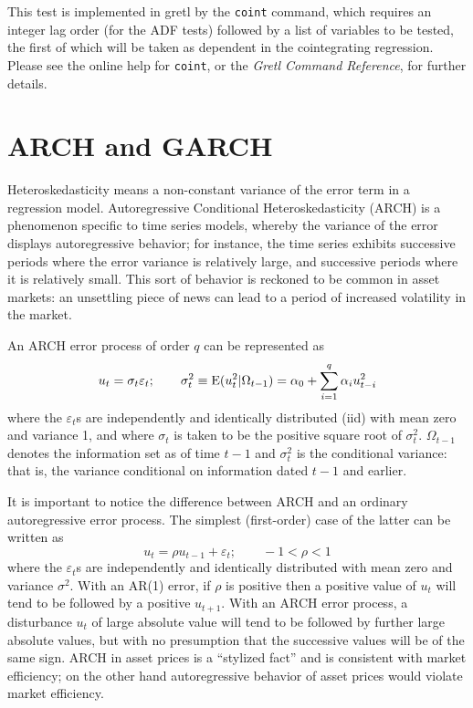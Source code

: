 This test is implemented in gretl by the \texttt{coint} command,
which requires an integer lag order (for the ADF tests) followed by a
list of variables to be tested, the first of which will be taken as
dependent in the cointegrating regression. Please see the online help
for \texttt{coint}, or the \textit{Gretl Command Reference}, for
further details.


\section{ARCH and GARCH}
\label{sec:arch-garch}

Heteroskedasticity means a non-constant variance of the error term in
a regression model.  Autoregressive Conditional Heteroskedasticity
(ARCH) is a phenomenon specific to time series models, whereby the
variance of the error displays autoregressive behavior; for instance,
the time series exhibits successive periods where the error variance
is relatively large, and successive periods where it is relatively
small.  This sort of behavior is reckoned to be common in asset
markets: an unsettling piece of news can lead to a period of increased
volatility in the market.

An ARCH error process of order $q$ can be represented as
\[
u_t = \sigma_t \varepsilon_t; \qquad
\sigma^2_t \equiv {\rm E}(u^2_t|\Omega_{t-1}) = 
\alpha_0 + \sum_{i=1}^q \alpha_i u^2_{t-i}
\]
where the $\varepsilon_t$s are independently and identically
distributed (iid) with mean zero and variance 1, and where $\sigma_t$
is taken to be the positive square root of $\sigma^2_t$.
$\Omega_{t-1}$ denotes the information set as of time $t-1$ and
$\sigma^2_t$ is the conditional variance: that is, the
variance conditional on information dated $t-1$ and earlier.

It is important to notice the difference between ARCH and an ordinary
autoregressive error process.  The simplest (first-order) case of the
latter can be written as
\[
u_t = \rho u_{t-1} + \varepsilon_t; \qquad -1 < \rho < 1
\]
where the $\varepsilon_t$s are independently and identically
distributed with mean zero and variance $\sigma^2$.  With an AR(1)
error, if $\rho$ is positive then a positive value of $u_t$ will tend
to be followed by a positive $u_{t+1}$.  With an ARCH error process, a
disturbance $u_t$ of large absolute value will tend to be followed by
further large absolute values, but with no presumption that the
successive values will be of the same sign.  ARCH in asset prices is a
``stylized fact'' and is consistent with market efficiency; on the
other hand autoregressive behavior of asset prices would violate
market efficiency.

